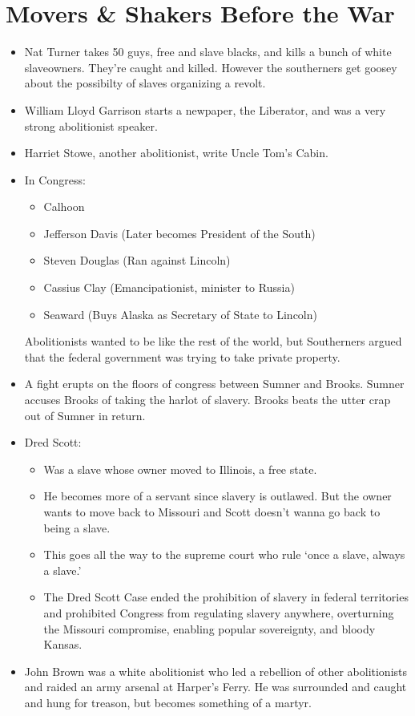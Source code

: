 \documentclass{article}
\begin{document}
\section{Movers \& Shakers Before the War}
  \begin{itemize}
    \item Nat Turner takes 50 guys, free and slave blacks, and kills a bunch of white slaveowners. They're caught and killed. However the southerners get goosey about the possibilty of slaves organizing a revolt.
    \item William Lloyd Garrison starts a newpaper, the Liberator, and was a very strong abolitionist speaker.
    \item Harriet Stowe, another abolitionist, write Uncle Tom's Cabin.
    \item In Congress:
      \begin{itemize}
        \item Calhoon
        \item Jefferson Davis (Later becomes President of the South)
        \item Steven Douglas (Ran against Lincoln)
        \item Cassius Clay (Emancipationist, minister to Russia)
        \item Seaward (Buys Alaska as Secretary of State to Lincoln)
      \end{itemize}
      Abolitionists wanted to be like the rest of the world, but Southerners argued that the federal government was trying to take private property.
      \item A fight erupts on the floors of congress between Sumner and Brooks. Sumner accuses Brooks of taking the harlot of slavery. Brooks beats the utter crap out of Sumner in return.
      \item Dred Scott:
        \begin{itemize}
          \item Was a slave whose owner moved to Illinois, a free state.
          \item He becomes more of a servant since slavery is outlawed. But the owner wants to move back to Missouri and Scott doesn't wanna go back to being a slave.
          \item This goes all the way to the supreme court who rule `once a slave, always a slave.'
          \item The Dred Scott Case ended the prohibition of slavery in federal territories and prohibited Congress from regulating slavery anywhere, overturning the Missouri compromise, enabling popular sovereignty, and bloody Kansas.
        \end{itemize}
      \item John Brown was a white abolitionist who led a rebellion of other abolitionists and raided an army arsenal at Harper's Ferry. He was surrounded and caught and hung for treason, but becomes something of a martyr.
  \end{itemize}
\end{document}
